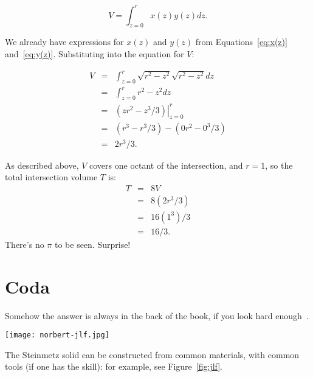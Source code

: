 \documentclass[twocolumn]{article}
\theoremstyle{definition}
\theoremstyle{plain}
\begin{document}
\begin{equation*}
  V = \int_{z=0}^r x(z) y(z) dz.
\end{equation*}

We already have expressions for $x(z)$ and $y(z)$ from
Equations~\ref{eq:x(z)} and~\ref{eq:y(z)}.  Substituting into the
equation for $V$:

\begin{eqnarray*}
  V & = & \int_{z=0}^r \sqrt{r^2 - z^2} \sqrt{r^2 - z^2} dz \\
  & = & \int_{z=0}^r r^2 - z^2 dz \\
  & = & \left. (zr^2 - z^3/3) \right|_{z=0}^r \\
  & = & (r^3 - r^3/3) - (0r^2 - 0^3/3) \\
  & = & 2r^3/3.
\end{eqnarray*}

As described above, $V$ covers one octant of the intersection, and
$r=1$, so the total intersection volume $T$ is:
\begin{eqnarray*}
  T & = & 8V \\
  & = & 8(2r^3/3) \\
  & = & 16(1^3)/3 \\
  & = & 16/3.
\end{eqnarray*}
There's no $\pi$ to be seen.  Surprise!

\section{Coda}

Somehow the answer is always in the back of the book, if you look hard
enough~\cite{Wikipedia-Steinmetz}.

\begin{figure*}
  \texttt{[image: norbert-jlf.jpg]}
  \caption{A Steinmetz solid in real life, courtesy of John Freeman}
  \label{fig:jlf}
\end{figure*}
The Steinmetz solid can be constructed from common materials, with
common tools (if one has the skill):  for example, see
Figure~\ref{fig:jlf}.



\end{document}
